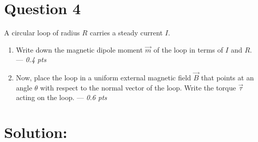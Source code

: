 \section*{Question 4}
A circular loop of radius $R$ carries a steady current $I$.
\begin{enumerate}
    \item[(a)] Write down the magnetic dipole moment $\vec{m}$ of the loop in terms of $I$ and $R$. --- \textit{0.4 pts}
    \item[(b)] Now, place the loop in a uniform external magnetic field $\vec{B}$ that points at an angle $\theta$ with respect to the normal vector of the loop. Write the torque $\vec{\tau}$ acting on the loop. --- \textit{0.6 pts} 
\end{enumerate}
 \section*{Solution:}
